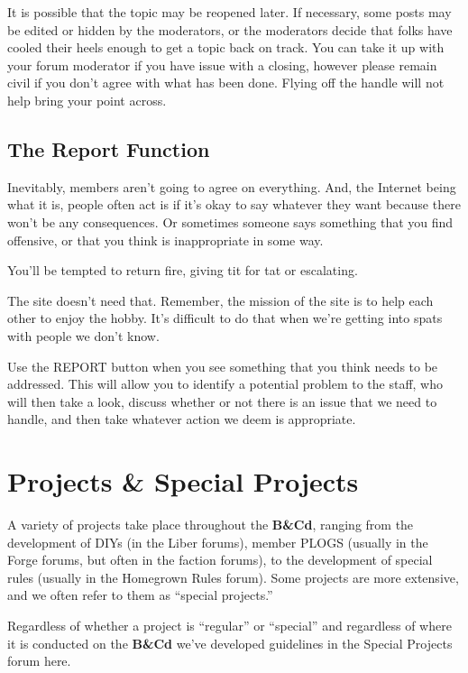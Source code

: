 \documentclass[12pt]{article}
\newcommand{\BnC}{{\textbf{B\&Cd}}}%
\begin{document}
It is possible that the topic may be reopened later. If necessary, some 
posts may be edited or hidden by the moderators, or the moderators 
decide that folks have cooled their heels enough to get a topic back on 
track. You can take it up with your forum moderator if you have issue 
with a closing, however please remain civil if you don't agree with 
what has been done. Flying off the handle will not help bring your 
point across.

\subsection{The Report Function}

Inevitably, members aren't going to agree on everything. And, the 
Internet being what it is, people often act is if it's okay to say 
whatever they want because there won't be any consequences. Or 
sometimes someone says something that you find offensive, or that you 
think is inappropriate in some way.

You'll be tempted to return fire, giving tit for tat or escalating.

The site doesn't need that. Remember, the mission of the site is to 
help each other to enjoy the hobby. It's difficult to do that when 
we're getting into spats with people we don't know.

Use the REPORT button when you see something that you think needs to be 
addressed. This will allow you to identify a potential problem to the 
staff, who will then take a look, discuss whether or not there is an 
issue that we need to handle, and then take whatever action we deem is 
appropriate.


\section{Projects \& Special Projects}

A variety of projects take place throughout the {\BnC}, 
ranging from the development of DIYs (in the Liber forums), member 
PLOGS (usually in the Forge forums, but often in the faction forums), 
to the development of special rules (usually in the Homegrown Rules 
forum). Some projects are more extensive, and we often refer to them as 
``special projects.''

Regardless of whether a project is ``regular'' or ``special'' and 
regardless of where it is conducted on the {\BnC} we've developed 
guidelines in the Special Projects forum here.
\end{document}
